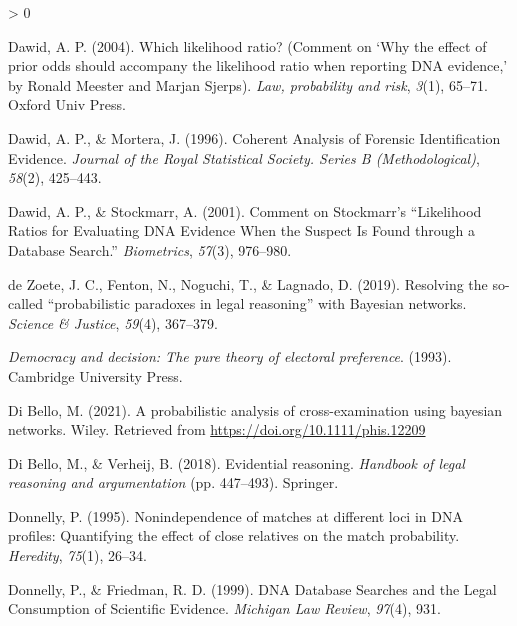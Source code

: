 \documentclass[
  10pt,
  dvipsnames,enabledeprecatedfontcommands]{scrartcl}
\newlength{\cslhangindent}
\newenvironment{CSLReferences}[2] %
 {%
  \setlength{\parindent}{0pt}
  \ifodd #1 \everypar{\setlength{\hangindent}{\cslhangindent}}\ignorespaces\fi
  \ifnum #2 > 0
  \setlength{\parskip}{#2\baselineskip}
  \fi
 }%
 {}
\begin{document}
\begin{CSLReferences}{1}{0}
\leavevmode\hypertarget{ref-dawid2004likelihood}{}%
Dawid, A. P. (2004). Which likelihood ratio? (Comment on {`{W}hy the
effect of prior odds should accompany the likelihood ratio when
reporting {DNA} evidence,'} by {R}onald {M}eester and {M}arjan
{S}jerps). \emph{Law, probability and risk}, \emph{3}(1), 65--71. Oxford
Univ Press.

\leavevmode\hypertarget{ref-dawid1996CoherentAnalysisForensic}{}%
Dawid, A. P., \& Mortera, J. (1996). Coherent {Analysis} of {Forensic
Identification Evidence}. \emph{Journal of the Royal Statistical
Society. Series B (Methodological)}, \emph{58}(2), 425--443.

\leavevmode\hypertarget{ref-dawid2001CommentStockmarrLikelihood}{}%
Dawid, A. P., \& Stockmarr, A. (2001). Comment on {Stockmarr}'s
{``{Likelihood Ratios} for {Evaluating DNA Evidence When} the {Suspect
Is Found} through a {Database Search}.''} \emph{Biometrics},
\emph{57}(3), 976--980.

\leavevmode\hypertarget{ref-dezoete2019ResolvingSocalledProbabilistic}{}%
de Zoete, J. C., Fenton, N., Noguchi, T., \& Lagnado, D. (2019).
Resolving the so-called {``probabilistic paradoxes in legal reasoning''}
with {Bayesian} networks. \emph{Science \& Justice}, \emph{59}(4),
367--379.

\leavevmode\hypertarget{ref-brennan_lomasky_1993}{}%
\emph{Democracy and decision: The pure theory of electoral preference}.
(1993). Cambridge University Press.

\leavevmode\hypertarget{ref-Bello2021probabilisticCrossexamination}{}%
Di Bello, M. (2021). A probabilistic analysis of cross-examination using
bayesian networks. Wiley. Retrieved from
\url{https://doi.org/10.1111/phis.12209}

\leavevmode\hypertarget{ref-di2018evidential}{}%
Di Bello, M., \& Verheij, B. (2018). Evidential reasoning.
\emph{Handbook of legal reasoning and argumentation} (pp. 447--493).
Springer.

\leavevmode\hypertarget{ref-donnelly1995NonindependenceMatchesDifferent}{}%
Donnelly, P. (1995). Nonindependence of matches at different loci in
{DNA} profiles: Quantifying the effect of close relatives on the match
probability. \emph{Heredity}, \emph{75}(1), 26--34.

\leavevmode\hypertarget{ref-donnelly1999DNADatabaseSearches}{}%
Donnelly, P., \& Friedman, R. D. (1999). {DNA Database Searches} and the
{Legal Consumption} of {Scientific Evidence}. \emph{Michigan Law
Review}, \emph{97}(4), 931.


\end{CSLReferences}
\end{document}
